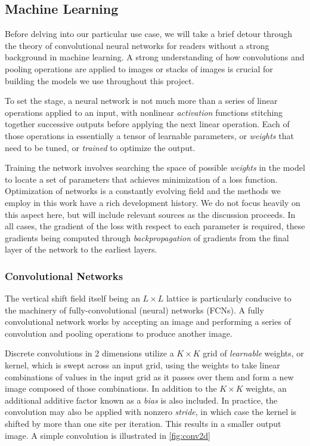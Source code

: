 \documentclass[12pt]{article}
\begin{document}
\subsection{Machine Learning}

Before delving into our particular use case, we will take a brief detour through the theory of convolutional neural networks for readers
without a strong background in machine learning. A strong understanding of how convolutions and pooling operations are applied to images or stacks of images is crucial
for building the models we use throughout this project.  

To set the stage, a neural network is not much more than a series of linear operations applied to an input, with nonlinear \textit{activation}
functions stitching together successive outputs before applying the next linear operation. Each of those operations ia essentially a tensor of learnable parameters, or \textit{weights} that need
to be tuned, or \textit{trained} to optimize the output.

Training the network involves searching the space of possible \textit{weights} in the model to locate a set of parameters that achieves minimization
of a loss function. Optimization of networks is a constantly evolving field and the methods we employ in this work have a rich
development history. We do not focus heavily on this aspect here, but will include relevant sources as the discussion proceeds. In all cases,
the gradient of the loss with respect to each parameter is required, these gradients being computed through \textit{backpropagation} of gradients from the
final layer of the network to the earliest layers.

\subsubsection{Convolutional Networks}

The vertical shift field itself being an $L \times L$ lattice is particularly conducive to the machinery of fully-convolutional (neural)
networks (FCNs). A fully convolutional network works by accepting an image and performing a series of convolution and pooling operations
to produce another image. 

Discrete convolutions in 2 dimensions utilize a $K\times K$ grid of \textit{learnable} weights, or kernel, which is swept across an input grid, using the weights to take linear combinations of values 
in the input grid as it passes over them and form a new image composed of those combinations. 
In addition to the $K\times K$ weights, an additional additive factor known as a \textit{bias} is also included. In practice, the convolution
may also be applied with nonzero \textit{stride}, in which case the kernel is shifted by more than one site per iteration. This results in a smaller output image.
A simple convolution is illustrated in \ref{fig:conv2d}
\end{document}

